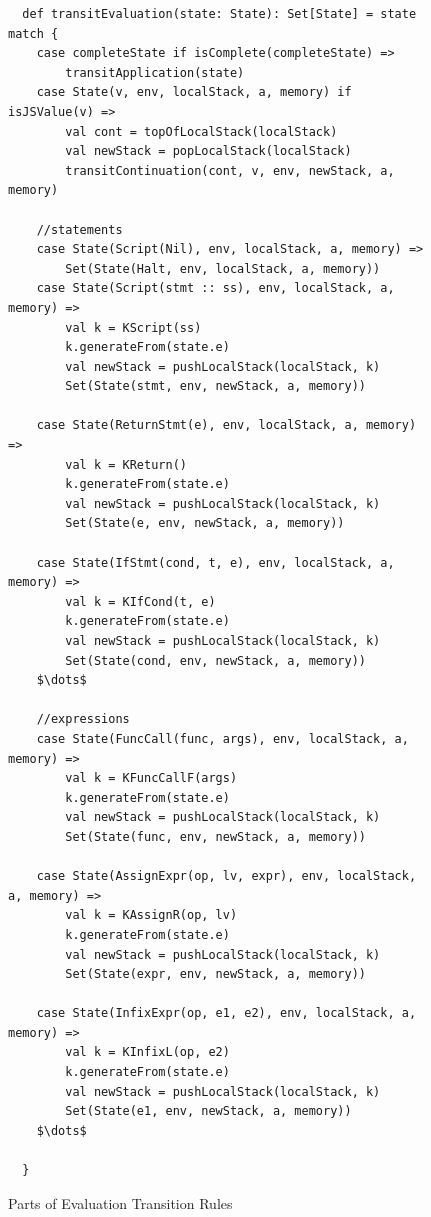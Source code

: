\documentclass{article}
\begin{document}
\begin{figure}
\lstset{language=Scala, mathescape}
\begin{lstlisting}
  def transitEvaluation(state: State): Set[State] = state match {
    case completeState if isComplete(completeState) =>
        transitApplication(state)
    case State(v, env, localStack, a, memory) if isJSValue(v) =>
        val cont = topOfLocalStack(localStack)
        val newStack = popLocalStack(localStack)
        transitContinuation(cont, v, env, newStack, a, memory)

    //statements
    case State(Script(Nil), env, localStack, a, memory) =>
        Set(State(Halt, env, localStack, a, memory))
    case State(Script(stmt :: ss), env, localStack, a, memory) =>
        val k = KScript(ss)
        k.generateFrom(state.e)
        val newStack = pushLocalStack(localStack, k)
        Set(State(stmt, env, newStack, a, memory))

    case State(ReturnStmt(e), env, localStack, a, memory) =>
        val k = KReturn()
        k.generateFrom(state.e)
        val newStack = pushLocalStack(localStack, k)
        Set(State(e, env, newStack, a, memory))

    case State(IfStmt(cond, t, e), env, localStack, a, memory) =>
        val k = KIfCond(t, e)
        k.generateFrom(state.e)
        val newStack = pushLocalStack(localStack, k)
        Set(State(cond, env, newStack, a, memory))
    $\dots$

    //expressions
    case State(FuncCall(func, args), env, localStack, a, memory) =>
        val k = KFuncCallF(args)
        k.generateFrom(state.e)
        val newStack = pushLocalStack(localStack, k)
        Set(State(func, env, newStack, a, memory))

    case State(AssignExpr(op, lv, expr), env, localStack, a, memory) =>
        val k = KAssignR(op, lv)
        k.generateFrom(state.e)
        val newStack = pushLocalStack(localStack, k)
        Set(State(expr, env, newStack, a, memory))

    case State(InfixExpr(op, e1, e2), env, localStack, a, memory) =>
        val k = KInfixL(op, e2)
        k.generateFrom(state.e)
        val newStack = pushLocalStack(localStack, k)
        Set(State(e1, env, newStack, a, memory))
    $\dots$

  }
\end{lstlisting}
\caption{Parts of Evaluation Transition Rules}
\label{fig:eval}
\end{figure}
\end{document}
